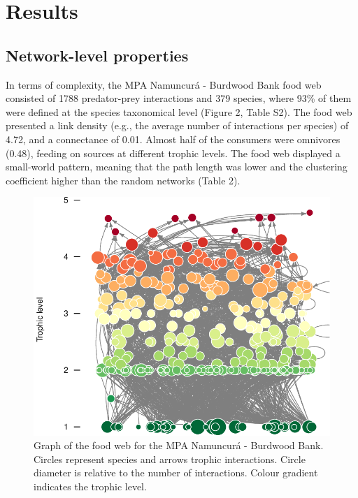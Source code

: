 \documentclass[preprint, 3p,
authoryear]{elsarticle} %
\begin{document}
\hypertarget{results}{%
\section{Results}\label{results}}

\hypertarget{network-level-properties}{%
\subsection{Network-level properties}\label{network-level-properties}}

In terms of complexity, the MPA Namuncurá - Burdwood Bank food web
consisted of 1788 predator-prey interactions and 379 species, where 93\%
of them were defined at the species taxonomical level (Figure 2, Table
S2). The food web presented a link density (e.g., the average number of
interactions per species) of 4.72, and a connectance of 0.01. Almost
half of the consumers were omnivores (0.48), feeding on sources at
different trophic levels. The food web displayed a small-world pattern,
meaning that the path length was lower and the clustering coefficient
higher than the random networks (Table 2).

\newpage

\begin{figure}

{\centering \includegraphics{MS_Burdwood_foodweb_files/figure-latex/figure2-1} 

}

\caption{Graph of the food web for the MPA Namuncurá - Burdwood Bank. Circles represent species and arrows trophic interactions. Circle diameter is relative to the number of interactions. Colour gradient indicates the trophic level.}\label{fig:figure2}
\end{figure}
\end{document}
